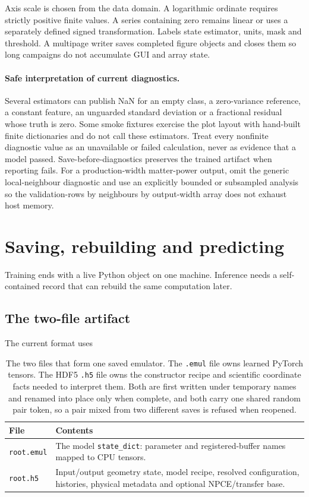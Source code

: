 \documentclass[10pt,aps,prd,twocolumn,nofootinbib]{revtex4-2}
\newcommand{\code}[1]{\texttt{#1}}
\begin{document}
Axis scale is chosen from the data domain.  A logarithmic ordinate requires
strictly positive finite values.  A series containing zero remains linear or
uses a separately defined signed transformation.  Labels state estimator,
units, mask and threshold.  A multipage writer saves completed figure objects
and closes them so long campaigns do not accumulate GUI and array state.

\paragraph{Safe interpretation of current diagnostics.}
Several estimators can publish NaN for an empty class, a zero-variance
reference, a constant feature, an unguarded standard deviation or a
fractional residual whose truth is zero.  Some smoke fixtures exercise the
plot layout with hand-built finite dictionaries and do not call these
estimators.  Treat every nonfinite diagnostic value as an unavailable or failed
calculation, never as evidence that a model passed.  Save-before-diagnostics
preserves the trained artifact when reporting fails.  For a production-width
matter-power output, omit the generic local-neighbour diagnostic and use an
explicitly bounded or subsampled analysis so the validation-rows by neighbours
by output-width array does not exhaust host memory.

\section{Saving, rebuilding and predicting}
\label{chap:artifacts}

Training ends with a live Python object on one machine.  Inference needs a
self-contained record that can rebuild the same computation later.

\subsection{The two-file artifact}

The current format uses
\begin{table}[t]
\centering
\begin{tabular}{p{}p{}}
\toprule
File & Contents \\
\midrule
\code{root.emul} & The model \code{state\_dict}: parameter and registered-buffer
names mapped to CPU tensors.  \\
\code{root.h5} & Input/output geometry state, model recipe, resolved
configuration, histories, physical metadata and optional NPCE/transfer base.  \\
\bottomrule
\end{tabular}
\caption{The two files that form one saved emulator.  The
\code{.emul} file owns learned PyTorch tensors.  The HDF5 \code{.h5} file owns
the constructor recipe and scientific coordinate facts needed to interpret
them.  Both are first written under temporary names and renamed into place
only when complete, and both carry one shared random pair token, so a pair
mixed from two different saves is refused when reopened.}
\label{tab:artifact-files}
\end{table}
\end{document}
